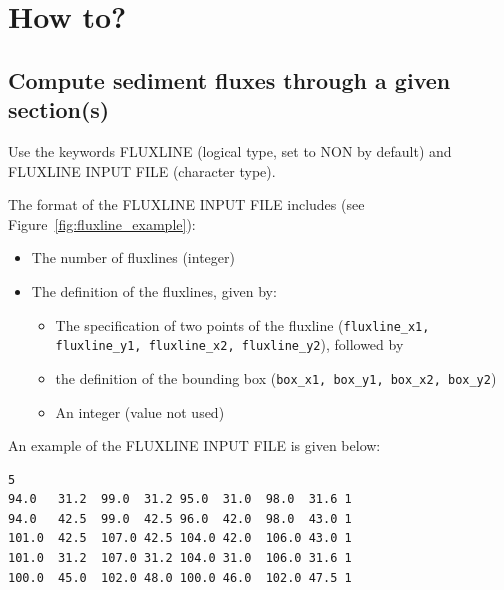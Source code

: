 \chapter[How to]{How to?}
\pagebreak
\section{Compute sediment fluxes through a given section(s)}
Use the keywords {\ttfamily FLUXLINE} (logical type, set to {\ttfamily NON} by default) and {\ttfamily FLUXLINE INPUT FILE} (character type).

The format of the {\ttfamily FLUXLINE INPUT FILE} includes (see Figure~\ref{fig:fluxline_example}):
\begin{itemize}
\item The number of fluxlines (integer)
\item The definition of the fluxlines, given by:
  \begin{itemize}
  \item The specification of two points of the fluxline (\texttt{fluxline\_x1, fluxline\_y1, fluxline\_x2, fluxline\_y2}), followed by
  \item the definition of the bounding box (\texttt{box\_x1, box\_y1, box\_x2, box\_y2})
  \item An integer (value not used)
  \end{itemize}
\end{itemize}

An example of the {\ttfamily FLUXLINE INPUT FILE} is given below:

\begin{lstlisting}[frame=trBL]
5
94.0   31.2  99.0  31.2 95.0  31.0  98.0  31.6 1
94.0   42.5  99.0  42.5 96.0  42.0  98.0  43.0 1
101.0  42.5  107.0 42.5 104.0 42.0  106.0 43.0 1
101.0  31.2  107.0 31.2 104.0 31.0  106.0 31.6 1
100.0  45.0  102.0 48.0 100.0 46.0  102.0 47.5 1  
\end{lstlisting}     


